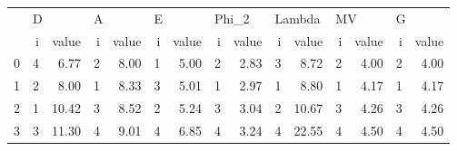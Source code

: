 \begin{tabular}{lrrrrrrrrrrrrrr}
\toprule
{} & \multicolumn{2}{l}{D} & \multicolumn{2}{l}{A} & \multicolumn{2}{l}{E} & \multicolumn{2}{l}{Phi\_2} & \multicolumn{2}{l}{Lambda} & \multicolumn{2}{l}{MV} & \multicolumn{2}{l}{G} \\
{} &  i &  value &  i & value &  i & value &     i & value &      i &  value &  i & value &  i & value \\
\midrule
0 &  4 &   6.77 &  2 &  8.00 &  1 &  5.00 &     2 &  2.83 &      3 &   8.72 &  2 &  4.00 &  2 &  4.00 \\
1 &  2 &   8.00 &  1 &  8.33 &  3 &  5.01 &     1 &  2.97 &      1 &   8.80 &  1 &  4.17 &  1 &  4.17 \\
2 &  1 &  10.42 &  3 &  8.52 &  2 &  5.24 &     3 &  3.04 &      2 &  10.67 &  3 &  4.26 &  3 &  4.26 \\
3 &  3 &  11.30 &  4 &  9.01 &  4 &  6.85 &     4 &  3.24 &      4 &  22.55 &  4 &  4.50 &  4 &  4.50 \\
\bottomrule
\end{tabular}
